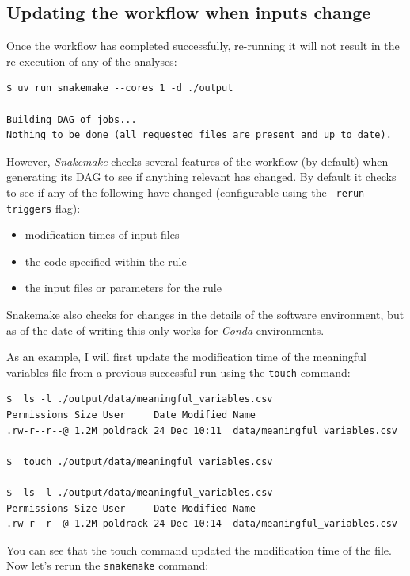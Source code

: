 \subsection{Updating the workflow when inputs change}

Once the workflow has completed successfully, re-running it will not result in the re-execution of any of the analyses:

\begin{lstlisting}[style=shellshort]
$ uv run snakemake --cores 1 -d ./output

Building DAG of jobs...
Nothing to be done (all requested files are present and up to date).
\end{lstlisting}

However, \textit{Snakemake} checks several features of the workflow (by default) when generating its DAG to see if anything relevant has changed.  By default it checks to see if any of the following have changed (configurable using the \texttt{-rerun-triggers} flag):

\begin{itemize}
\item modification times of input files
\item the code specified within the rule
\item the input files or parameters for the rule
\end{itemize}

Snakemake also checks for changes in the details of the software environment, but as of the date of writing this only works for \textit{Conda} environments.

As an example, I will first update the modification time of the meaningful variables file from a previous successful run using the \texttt{touch} command:

\begin{lstlisting}[style=shell]
$  ls -l ./output/data/meaningful_variables.csv
Permissions Size User     Date Modified Name
.rw-r--r--@ 1.2M poldrack 24 Dec 10:11  data/meaningful_variables.csv

$  touch ./output/data/meaningful_variables.csv

$  ls -l ./output/data/meaningful_variables.csv
Permissions Size User     Date Modified Name
.rw-r--r--@ 1.2M poldrack 24 Dec 10:14  data/meaningful_variables.csv
\end{lstlisting}

You can see that the touch command updated the modification time of the file.  Now let's rerun the \texttt{snakemake} command:

